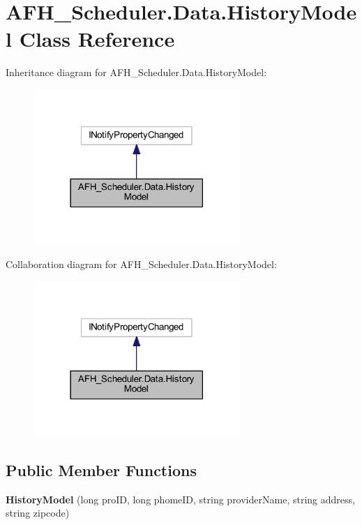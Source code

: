 \section{A\+F\+H\+\_\+\+Scheduler.\+Data.\+History\+Model Class Reference}
\label{class_a_f_h___scheduler_1_1_data_1_1_history_model}


Inheritance diagram for A\+F\+H\+\_\+\+Scheduler.\+Data.\+History\+Model\+:
\nopagebreak
\begin{figure}[H]
\begin{center}
\leavevmode
\includegraphics[width=222pt]{class_a_f_h___scheduler_1_1_data_1_1_history_model__inherit__graph}
\end{center}
\end{figure}


Collaboration diagram for A\+F\+H\+\_\+\+Scheduler.\+Data.\+History\+Model\+:
\nopagebreak
\begin{figure}[H]
\begin{center}
\leavevmode
\includegraphics[width=222pt]{class_a_f_h___scheduler_1_1_data_1_1_history_model__coll__graph}
\end{center}
\end{figure}
\subsection*{Public Member Functions}
\begin{DoxyCompactItemize}
\item 
\textbf{ History\+Model} (long pro\+ID, long phome\+ID, string provider\+Name, string address, string zipcode)
\end{DoxyCompactItemize}
